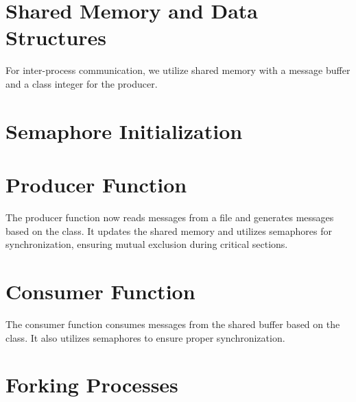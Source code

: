 

\lstset{style=xcodestyle}

\section{Shared Memory and Data Structures}

For inter-process communication, we utilize shared memory with a message buffer and a class integer for the producer.



\section{Semaphore Initialization}



\section{Producer Function}

The producer function now reads messages from a file and generates messages based on the class. It updates the shared memory and utilizes semaphores for synchronization, ensuring mutual exclusion during critical sections.



\section{Consumer Function}

The consumer function consumes messages from the shared buffer based on the class. It also utilizes semaphores to ensure proper synchronization.



\section{Forking Processes}


